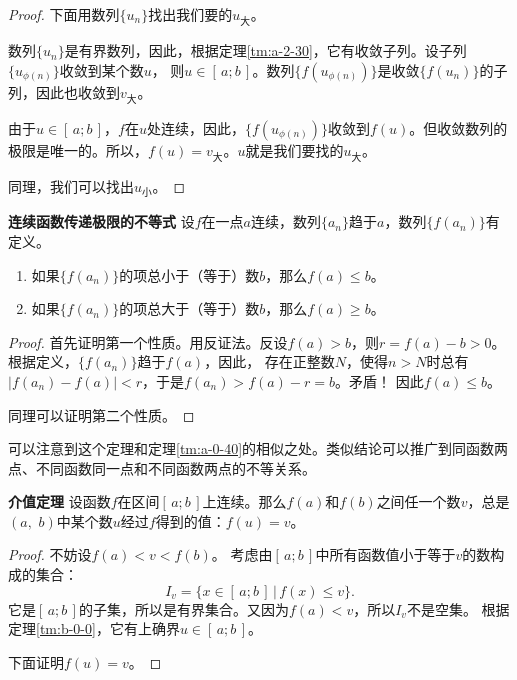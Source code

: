 \documentclass[12pt,UTF8]{ctexbook}
\begin{document}
\begin{appendix}
\begin{proof}
    下面用数列$\{u_n\}$找出我们要的$u_{\text{大}}$。

    数列$\{u_n\}$是有界数列，因此，根据定理\ref{tm:a-2-30}，它有收敛子列。设子列$\{u_{\phi(n)}\}$收敛到某个数$u$，
    则$u\in[\,a;b\,]$。数列$\{f(u_{\phi(n)})\}$是收敛$\{f(u_n)\}$的子列，因此也收敛到$v_{\text{大}}$。

    由于$u\in[\,a;b\,]$，$f$在$u$处连续，因此，$\{f(u_{\phi(n)})\}$收敛到$f(u)$。但收敛数列的极限是唯一的。所以，$f(u) = v_{\text{大}}$。$u$就是我们要找的$u_{\text{大}}$。

    同理，我们可以找出$u_{\text{小}}$。
\end{proof}

\begin{tm}{\textbf{连续函数传递极限的不等式}}\label{tm:b-1-10}
    设$f$在一点$a$连续，数列$\{a_n\}$趋于$a$，数列$\{f(a_n)\}$有定义。
    \begin{enumerate}
        \item 如果$\{f(a_n)\}$的项总小于（等于）数$b$，那么$f(a)\leqslant b$。
        \item 如果$\{f(a_n)\}$的项总大于（等于）数$b$，那么$f(a)\geqslant b$。
    \end{enumerate}
\end{tm}
\begin{proof}
    首先证明第一个性质。用反证法。反设$f(a) > b$，则$r = f(a) - b > 0$。根据定义，$\{f(a_n)\}$趋于$f(a)$，因此，
    存在正整数$N$，使得$n>N$时总有$|f(a_n) - f(a)| < r$，于是$f(a_n) > f(a) - r = b$。矛盾！
    因此$f(a)\leqslant b$。

    同理可以证明第二个性质。
\end{proof}

可以注意到这个定理和定理\ref{tm:a-0-40}的相似之处。类似结论可以推广到同函数两点、不同函数同一点和不同函数两点的不等关系。

\begin{tm}{\textbf{介值定理}}\label{tm:b-1-20}
    设函数$f$在区间$[\,a;b\,]$上连续。那么$f(a)$和$f(b)$之间任一个数$v$，总是$(a, \,\,b)$中某个数$u$经过$f$得到的值：$f(u) = v$。
\end{tm}
\begin{proof}
    不妨设$f(a) < v < f(b)$。
    考虑由$[\,a;b\,]$中所有函数值小于等于$v$的数构成的集合：
    $$I_v = \{ x \in [\,a;b\,] \, | \, f(x) \leqslant v\}.$$
    它是$[\,a;b\,]$的子集，所以是有界集合。又因为$f(a) < v$，所以$I_v$不是空集。
    根据定理\ref{tm:b-0-0}，它有上确界$u\in[\,a;b\,]$。

    下面证明$f(u) = v$。


\end{proof}
\end{appendix}
\end{document}
